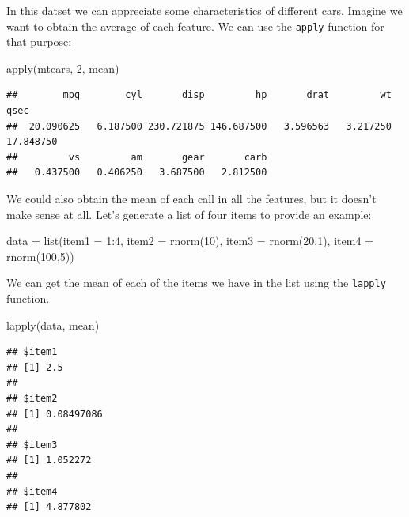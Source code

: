 \documentclass[
]{book}
\newenvironment{Shaded}{\begin{snugshade}}{\end{snugshade}}
\newcommand{\AttributeTok}[1]{\textcolor[rgb]{0.77,0.63,0.00}{#1}}
\newcommand{\DecValTok}[1]{\textcolor[rgb]{0.00,0.00,0.81}{#1}}
\newcommand{\FunctionTok}[1]{\textcolor[rgb]{0.00,0.00,0.00}{#1}}
\newcommand{\NormalTok}[1]{#1}
\newcommand{\OtherTok}[1]{\textcolor[rgb]{0.56,0.35,0.01}{#1}}
\newcommand{\SpecialCharTok}[1]{\textcolor[rgb]{0.00,0.00,0.00}{#1}}
\theoremstyle{definition}
\theoremstyle{definition}
\theoremstyle{definition}
\theoremstyle{definition}
\theoremstyle{remark}
\begin{document}
In this datset we can appreciate some characteristics of different cars. Imagine we want to obtain the average of each feature. We can use the \texttt{apply} function for that purpose:

\begin{Shaded}
\begin{Highlighting}[]
\FunctionTok{apply}\NormalTok{(mtcars, }\DecValTok{2}\NormalTok{, mean)}
\end{Highlighting}
\end{Shaded}

\begin{verbatim}
##        mpg        cyl       disp         hp       drat         wt       qsec 
##  20.090625   6.187500 230.721875 146.687500   3.596563   3.217250  17.848750 
##         vs         am       gear       carb 
##   0.437500   0.406250   3.687500   2.812500
\end{verbatim}

We could also obtain the mean of each call in all the features, but it doesn't make sense at all. Let's generate a list of four items to provide an example:

\begin{Shaded}
\begin{Highlighting}[]
\NormalTok{data }\OtherTok{=} \FunctionTok{list}\NormalTok{(}\AttributeTok{item1 =} \DecValTok{1}\SpecialCharTok{:}\DecValTok{4}\NormalTok{,}
            \AttributeTok{item2 =} \FunctionTok{rnorm}\NormalTok{(}\DecValTok{10}\NormalTok{),}
            \AttributeTok{item3 =} \FunctionTok{rnorm}\NormalTok{(}\DecValTok{20}\NormalTok{,}\DecValTok{1}\NormalTok{),}
            \AttributeTok{item4 =} \FunctionTok{rnorm}\NormalTok{(}\DecValTok{100}\NormalTok{,}\DecValTok{5}\NormalTok{))}
\end{Highlighting}
\end{Shaded}

We can get the mean of each of the items we have in the list using the \texttt{lapply} function.

\begin{Shaded}
\begin{Highlighting}[]
\FunctionTok{lapply}\NormalTok{(data, mean)}
\end{Highlighting}
\end{Shaded}

\begin{verbatim}
## $item1
## [1] 2.5
## 
## $item2
## [1] 0.08497086
## 
## $item3
## [1] 1.052272
## 
## $item4
## [1] 4.877802
\end{verbatim}
\end{document}
